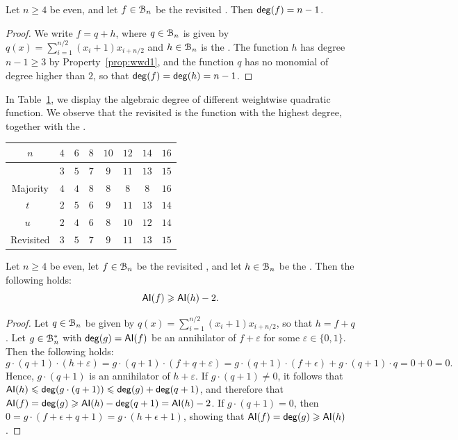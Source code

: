 \documentclass{llncs}
\begin{document}
\begin{proposition}
	Let $n\geq 4$ be even, and let $f\in\mathcal{B}_n$ be the revisited \hwbf{}. Then $\mathsf{deg}(f)=n-1$.
\end{proposition}
\begin{proof}
	We write $f=q+h$, where $q\in\mathcal{B}_n$ is given by $q(x)=\sum_{i=1}^{n/2} (x_i+1) x_{i+n/2}$ and $h\in\mathcal{B}_n$ is the \hwbf{}.
	The function $h$ has degree $n-1\geq 3$ by Property~\ref{prop:wwd1}, and the function $q$ has no monomial of degree higher than $2$, so that $\mathsf{deg}(f)=\mathsf{deg}(h)=n-1$.
\end{proof}

In Table~\ref{table:comparisonsDeg}, we display the algebraic degree of different weightwise quadratic function. We observe that the revisited \hwbf{} is the function with the highest degree, together with the \hwbf{}. 

\begin{table}[ht]
	\small
	\centering
	\begin{tabular}{|c|c|c|c|c|c|c|c|}
		\hline
		$n$ & $4$  & $6$  & $8$  &  $10$ & $12$ & $14$ & $16$  \\
		\hline
		\hwbf{}   & $3$  & $5$  & $7$  &  $9$ & $11$ & $13$ & $15$  \\  	
		Majority   & $4$  & $4$  & $8$  &  $8$ & $8$ & $8$ & $16$  \\
		$t$~\cite{DAM:MeaOza24}   & $2$  & $5$  & $6$  &  $9$ & $11$ & $13$ & $14$\\
		$u$~\cite{DAM:MeaOza24}   & $2$  & $4$  & $6$  &  $8$ & $10$ & $12$ & $14$ \\
		Revisited \hwbf{}  & $3$  & $5$  & $7$  &  $9$ & $11$ & $13$ & $15$\\
		\hline
	\end{tabular}
	\label{table:comparisonsDeg}
\end{table}

\begin{proposition}
	Let $n\geq 4$ be even, let $f\in\mathcal{B}_n$ be the revisited \hwbf{}, and let $h\in\mathcal{B}_n$ be the \hwbf{}. Then the following holds:
	\[\mathsf{AI}(f)\geqslant \mathsf{AI}(h)-2.\]
\end{proposition}

\begin{proof}
	Let $q\in\mathcal{B}_n$ be given by $q(x)=\sum_{i=1}^{n/2} (x_i+1) x_{i+n/2}$, so that $h=f+q$.
	Let $g\in\mathcal{B}_n^*$ with $\mathsf{deg}(g)=\mathsf{AI}(f)$ be an annihilator of $f+ \varepsilon$ for some $\varepsilon\in\{0,1\}$. 
	Then the following holds:
	\[g\cdot(q+1) \cdot(h+\varepsilon) = g\cdot(q+1)\cdot(f+q+\varepsilon)=g\cdot(q+1)\cdot(f+\epsilon)+g\cdot(q+1)\cdot q=0+0=0.\]
	Hence, $g\cdot(q+1)$ is an annihilator of $h+ \varepsilon$. 
	If $g\cdot(q+1)\ne 0$, it follows that $\mathsf{AI}(h)\leqslant\mathsf{deg}(g\cdot(q+1))\leqslant\mathsf{deg}(g)+\mathsf{deg}(q+1)$, and therefore that $\mathsf{AI}(f)=\mathsf{deg}(g)\geqslant\mathsf{AI}(h)-\mathsf{deg}(q+1)=\mathsf{AI}(h)-2$. If $g\cdot(q+1)=0$, then $0=g\cdot(f+\epsilon+q+1)=g\cdot(h+\epsilon+1)$, showing that $\mathsf{AI}(f)=\mathsf{deg}(g)\geqslant\mathsf{AI}(h)$.
\end{proof}
\end{document}
